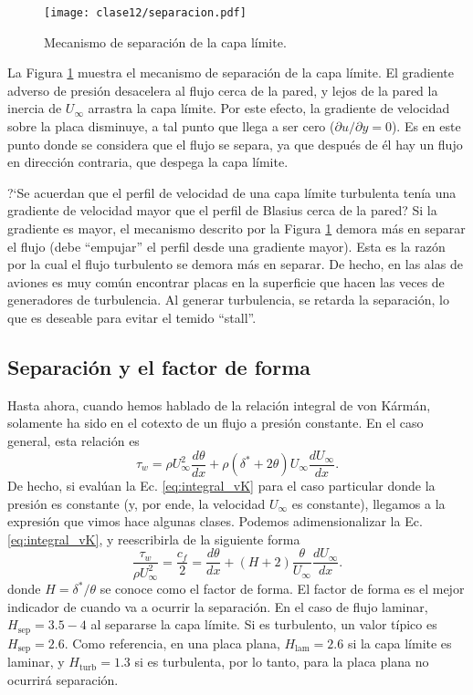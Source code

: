 \begin{figure}
\centering
\texttt{[image: clase12/separacion.pdf]}
\caption{Mecanismo de separación de la capa límite.}
\label{fig:separacion}
\end{figure}

La Figura \ref{fig:separacion} muestra el mecanismo de separación de la capa límite.
El gradiente adverso de presión desacelera al flujo cerca de la pared, y lejos de la pared la inercia de $U_\infty$ arrastra la capa límite.
Por este efecto, la gradiente de velocidad sobre la placa disminuye, a tal punto que llega a ser cero ($\partial u/\partial y=0$).
Es en este punto donde se considera que el flujo se separa, ya que después de él hay un flujo en dirección contraria, que despega la capa límite.

\mbox{?`}Se acuerdan que el perfil de velocidad de una capa límite turbulenta tenía una gradiente de velocidad mayor que el perfil de Blasius cerca de la pared?
Si la gradiente es mayor, el mecanismo descrito por la Figura \ref{fig:separacion} demora más en separar el flujo (debe ``empujar'' el perfil desde una gradiente mayor).
Esta es la razón por la cual el flujo turbulento se demora más en separar.
De hecho, en las alas de aviones es muy común encontrar placas en la superficie que hacen las veces de generadores de turbulencia.
Al generar turbulencia, se retarda la separación, lo que es deseable para evitar el temido ``stall''.

\subsection*{Separación y el factor de forma}

Hasta ahora, cuando hemos hablado de la relación integral de von Kármán, solamente ha sido en el cotexto de un flujo a presión constante.
En el caso general, esta relación es
%
\begin{equation}\label{eq:integral_vK}
\tau_w = \rho U_\infty^2\frac{d\theta}{dx} + \rho(\delta^*+2\theta)U_\infty \frac{dU_\infty}{dx}.
\end{equation}
%
De hecho, si evalúan la Ec. \eqref{eq:integral_vK} para el caso particular donde la presión es constante (y, por ende, la velocidad $U_\infty$ es constante), llegamos a la expresión que vimos hace algunas clases.
Podemos adimensionalizar la Ec. \eqref{eq:integral_vK}, y reescribirla de la siguiente forma
%
\begin{equation}
\frac{\tau_w}{\rho U_\infty^2} = \frac{c_f}{2} = \frac{d\theta}{dx} + (H+2)\frac{\theta}{U_\infty} \frac{dU_\infty}{dx}.
\end{equation}
%
donde $H=\delta^*/\theta$ se conoce como el factor de forma.
El factor de forma es el mejor indicador de cuando va a ocurrir la separación. 
En el caso de flujo laminar, $H_\text{sep}=3.5-4$ al separarse la capa límite.
Si es turbulento, un valor típico es $H_\text{sep}=2.6$.
Como referencia, en una placa plana, $H_\text{lam} = 2.6$ si la capa límite es laminar, y $H_\text{turb} = 1.3$ si es turbulenta, por lo tanto, para la placa plana no ocurrirá separación.

